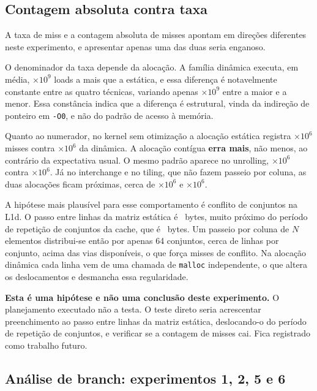 \documentclass[11pt,a4paper]{article}
\begin{document}
\subsection{Contagem absoluta contra taxa}
\label{sec:absoluto}

A taxa de miss e a contagem absoluta de misses apontam em direções diferentes neste
experimento, e apresentar apenas uma das duas seria enganoso.

O denominador da taxa depende da alocação. A família dinâmica executa, em média,
\valDeltaLoads$\times10^9$ loads a mais que a estática, e essa diferença é notavelmente
constante entre as quatro técnicas, variando apenas
\valDeltaLoadsAmp$\times10^9$ entre a maior e a menor. Essa constância indica que a
diferença é estrutural, vinda da indireção de ponteiro em \texttt{-O0}, e não do padrão de
acesso à memória.

Quanto ao numerador, no kernel sem otimização a alocação estática registra
\valMissAbsEstBase$\times10^6$ misses contra \valMissAbsDinBase$\times10^6$ da dinâmica.
A alocação contígua \textbf{erra mais}, não menos, ao contrário da expectativa usual. O
mesmo padrão aparece no unrolling, \valMissAbsEstUnroll$\times10^6$ contra
\valMissAbsDinUnroll$\times10^6$. Já no interchange e no tiling, que não fazem passeio por
coluna, as duas alocações ficam próximas, cerca de \valMissAbsEstInter$\times10^6$ e
\valMissAbsEstTiling$\times10^6$.

A hipótese mais plausível para esse comportamento é conflito de conjuntos na L1d. O passo
entre linhas da matriz estática é \valStrideLinha~bytes, muito próximo do período de
repetição de conjuntos da cache, que é \valPeriodoConjunto~bytes. Um passeio por coluna de
$N$ elementos distribui-se então por apenas 64 conjuntos, cerca de
\valLinhasPorConjunto{} linhas por conjunto, acima das \valAssociatividade{} vias
disponíveis, o que força misses de conflito. Na alocação dinâmica cada linha vem de uma
chamada de \texttt{malloc} independente, o que altera os deslocamentos e desmancha essa
regularidade.

\textbf{Esta é uma hipótese e não uma conclusão deste experimento.} O planejamento
executado não a testa. O teste direto seria acrescentar preenchimento ao passo entre
linhas da matriz estática, deslocando-o do período de repetição de conjuntos, e verificar
se a contagem de misses cai. Fica registrado como trabalho futuro.

\subsection{Análise de branch: experimentos 1, 2, 5 e 6}
\label{sec:fat2}
\end{document}
